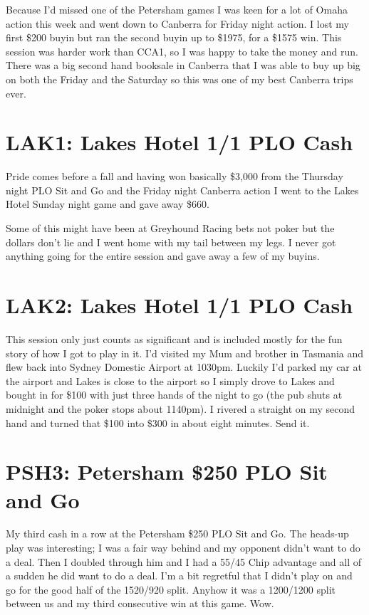 Because I'd missed one of the Petersham games I was keen for a lot of
Omaha action this week and went down to Canberra for Friday night
action. I lost my first \$200 buyin but ran the second buyin up to
\$1975, for a \$1575 win. This session was harder work than CCA1, so I
was happy to take the money and run. There was a big second hand
booksale in Canberra that I was able to buy up big on both the Friday
and the Saturday so this was one of my best Canberra trips ever.

\section*{LAK1: Lakes Hotel 1/1 PLO Cash}

Pride comes before a fall and having won basically \$3,000 from the
Thursday night PLO Sit and Go and the Friday night Canberra action I
went to the Lakes Hotel Sunday night game and gave away \$660.

Some of this might have been at Greyhound Racing bets not poker but
the dollars don't lie and I went home with my tail between my legs. I
never got anything going for the entire session and gave away a few of
my buyins.

\section*{LAK2: Lakes Hotel 1/1 PLO Cash}

This session only just counts as significant and is included mostly
for the fun story of how I got to play in it. I'd visited my Mum and
brother in Tasmania and flew back into Sydney Domestic Airport at
1030pm. Luckily I'd parked my car at the airport and Lakes is close to
the airport so I simply drove to Lakes and bought in for \$100 with
just three hands of the night to go (the pub shuts at midnight and the
poker stops about 1140pm). I rivered a straight on my second hand and
turned that \$100 into \$300 in about eight minutes. Send it.

\section*{PSH3: Petersham \$250 PLO Sit and Go}

My third cash in a row at the Petersham \$250 PLO Sit and Go. The
heads-up play was interesting; I was a fair way behind and my opponent
didn't want to do a deal. Then I doubled through him and I had a 55/45
Chip advantage and all of a sudden he did want to do a deal. I'm a bit
regretful that I didn't play on and go for the good half of the
1520/920 split. Anyhow it was a 1200/1200 split between us and my
third consecutive win at this game. Wow.

